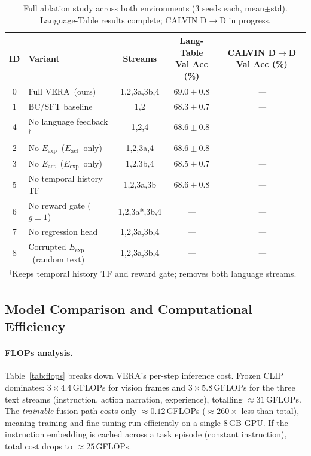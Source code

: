 \documentclass{article}
\newcommand{\modelname}{\textsc{VERA}\xspace}
\newcommand{\Lact}{$E_{\mathrm{act}}$\xspace}
\newcommand{\Lexp}{$E_{\mathrm{exp}}$\xspace}
\newcommand{\tbd}{\textit{---}\xspace}
\begin{document}
\begin{table}[h]
\centering
\caption{Full ablation study across both environments (3 seeds each, mean$\pm$std).
  Language-Table results complete; CALVIN D$\to$D in progress.}
\label{tab:ablations}
\small
\setlength{\tabcolsep}{4pt}
\begin{tabular}{clccc}
\toprule
\textbf{ID} & \textbf{Variant} & \textbf{Streams}
            & \makecell{Lang-Table\\Val Acc (\%)}
            & \makecell{CALVIN D$\to$D\\Val Acc (\%)} \\
\midrule
0  & Full \modelname\ (ours)              & 1,2,3a,3b,4  & $\mathbf{69.0\pm0.8}$ & \tbd \\
1  & BC/SFT baseline                      & 1,2          & $68.3\pm0.7$          & \tbd \\
4  & No language feedback$^\dagger$       & 1,2,4        & $68.6\pm0.8$          & \tbd \\
2  & No \Lexp\ (\Lact\ only)             & 1,2,3a,4     & $68.6\pm0.8$          & \tbd \\
3  & No \Lact\ (\Lexp\ only)             & 1,2,3b,4     & $68.5\pm0.7$          & \tbd \\
5  & No temporal history TF               & 1,2,3a,3b    & $68.6\pm0.8$          & \tbd \\
6  & No reward gate ($g\!\equiv\!1$)      & 1,2,3a*,3b,4 & \tbd                  & \tbd \\
7  & No regression head                   & 1,2,3a,3b,4  & \tbd                  & \tbd \\
8  & Corrupted \Lexp\ (random text)       & 1,2,3a,3b,4  & \tbd                  & \tbd \\
\bottomrule
\multicolumn{5}{l}{\footnotesize $^\dagger$Keeps temporal history TF and reward gate; removes both language streams.}\\
\end{tabular}
\end{table}

\subsection{Model Comparison and Computational Efficiency}
\label{sec:comparison}

\paragraph{FLOPs analysis.}
Table~\ref{tab:flops} breaks down VERA's per-step inference cost.
Frozen CLIP dominates: $3 \times 4.4$\,GFLOPs for vision frames
and $3 \times 5.8$\,GFLOPs for the three text streams
(instruction, action narration, experience), totalling $\approx\!31$\,GFLOPs.
The \emph{trainable} fusion path costs only $\approx\!0.12$\,GFLOPs
(${\approx}260\times$ less than total), meaning training
and fine-tuning run efficiently on a single 8\,GB GPU.
If the instruction embedding is cached across a task episode (constant instruction),
total cost drops to $\approx\!25$\,GFLOPs.
\end{document}
